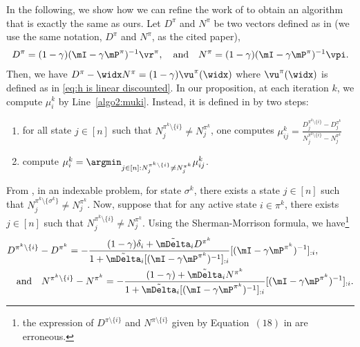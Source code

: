 In the following, we show how we can refine the work of \cite{akbarzadeh2020conditions} to obtain an algorithm that is exactly the same as ours.
Let $D^{\pi}$ and $N^{\pi}$ be two vectors defined as in \cite{akbarzadeh2020conditions} (we use the same notation,  $D^{\pi}$ and $N^{\pi}$, as the cited paper),
\begin{align*}
    D^{\pi} =(1-\gamma)(\mI-\gamma \mP^\pi)^{-1}\vr^{\pi}, \quad\text{and}\quad
    N^{\pi} =(1-\gamma)(\mI-\gamma \mP^\pi)^{-1}\vpi.
\end{align*}
Then, we have $D^{\pi} -\widx N^{\pi}=(1-\gamma)\vu^{\pi}(\widx)$ where $\vu^{\pi}(\widx)$ is defined as in \eqref{eq:h is linear discounted}. In our proposition, at each iteration $k$, we compute $\mu_i^k$ by Line~\ref{algo2:muki}. Instead, it is defined in \cite{akbarzadeh2020conditions} by two steps:
\begin{enumerate}
\item for all state $j\in[n]$ such that $N_j^{\pi^k\setminus\{i\}}{\neq} N_j^{\pi^k}$, one computes  $\mu^k_{ij}{=}\displaystyle\frac{D_j^{\pi^k\setminus\{i\}} -D_j^{\pi^k}}{ N_j^{\pi^k\setminus\{i\}} -N_j^{\pi^k}}$ 
\item \label{it:mu^k_i*} compute $\mu^k_i=\displaystyle\argmin_{j\in[n]:N_j^{\pi^k\setminus\{i\}}\neq N_j^{\pi^k}} \mu^k_{ij}$.
\end{enumerate}
From \cite[Theorem 2]{akbarzadeh2020conditions}, in an indexable problem, for state $\sigma^k$, there exists a state $j\in[n]$ such that $N_j^{\pi^k\setminus\{\sigma^k\}}\neq N_j^{\pi^k}$. Now, suppose that for any active state $i\in\pi^k$, there exists $j\in[n]$ such that $N_j^{\pi^k\setminus\{i\}}\neq N_j^{\pi^k}$. Using the Sherman-Morrison formula, we have\footnote{the expression of $D^{\pi\setminus\{i\}}$ and $N^{\pi\setminus\{i\}}$ given by Equation~$(18)$ in \cite{akbarzadeh2020conditions} are erroneous.}
\begin{align*}
    &D^{\pi^k\setminus\{i\}} -D^{\pi^k} = -\frac{(1-\gamma)\delta_i +\tilde{\mDelta}_iD^{\pi^k}}{1+\tilde{\mDelta}_i[(\mI-\gamma \mP^{\pi^k})^{-1}]_{: i}}[(\mI-\gamma \mP^{\pi^k})^{-1}]_{: i}, \\
    &\quad \text{and}\quad N^{\pi^k\setminus\{i\}} -N^{\pi^k} = -\frac{(1-\gamma) +\tilde{\mDelta}_iN^{\pi^k}}{1+\tilde{\mDelta}_i[(\mI-\gamma \mP^{\pi^k})^{-1}]_{: i}}[(\mI-\gamma \mP^{\pi^k})^{-1}]_{: i}.
\end{align*}
